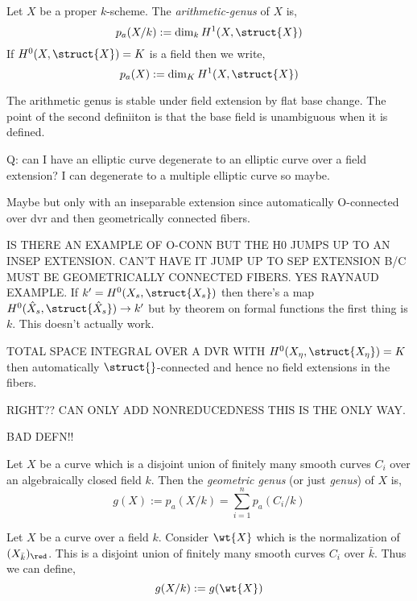 \documentclass[12pt]{article}
\begin{document}
\begin{prop}

\end{prop}

\begin{defn}
Let $X$ be a proper $k$-scheme. The \textit{arithmetic-genus} of $X$ is,
\[ p_a(X/k) := \dim_k H^1(X, \struct{X}) \]
If $H^0(X, \struct{X}) = K$ is a field then we write,
\[ p_a(X) := \dim_K H^1(X, \struct{X}) \]
\end{defn}

\begin{rmk}
The arithmetic genus is stable under field extension by flat base change.
The point of the second definiiton is that the base field is unambiguous when it is defined.
\end{rmk}

Q: can I have an elliptic curve degenerate to an elliptic curve over a field extension? I can degenerate to a multiple elliptic curve so maybe.

Maybe but only with an inseparable extension since automatically O-connected over dvr and then geometrically connected fibers. 

IS THERE AN EXAMPLE OF O-CONN BUT THE H0 JUMPS UP TO AN INSEP EXTENSION. CAN'T HAVE IT JUMP UP TO SEP EXTENSION B/C MUST BE GEOMETRICALLY CONNECTED FIBERS. YES RAYNAUD EXAMPLE. If $k' = H^0(X_s, \struct{X_s})$ then there's a map $H^0(\hat{X}_s, \struct{\hat{X}_s}) \to k'$ but by theorem on formal functions the first thing is $k$. This doesn't actually work. 

TOTAL SPACE INTEGRAL OVER A DVR WITH $H^0(X_\eta, \struct{X_{\eta}}) = K$ then automatically $\struct{}$-connected and hence no field extensions in the fibers.

RIGHT?? CAN ONLY ADD NONREDUCEDNESS THIS IS THE ONLY WAY.


BAD DEFN!!
\begin{defn}
Let $X$ be a curve which is a disjoint union of finitely many smooth curves $C_i$ over an algebraically closed field $k$. Then the \textit{geometric genus} (or just \textit{genus}) of $X$ is,
\[ g(X) :=  p_a(X/k) = \sum_{i = 1}^n p_a(C_i/k) \]
\end{defn}

\begin{defn}
Let $X$ be a curve over a field $k$. Consider $\wt{X}$ which is the normalization of $(X_{\bar{k}})_{\red}$. This is a disjoint union of finitely many smooth curves $C_i$ over $\bar{k}$. Thus we can define,
\[ g(X/k) := g(\wt{X}) \]
\end{defn}
\end{document}
